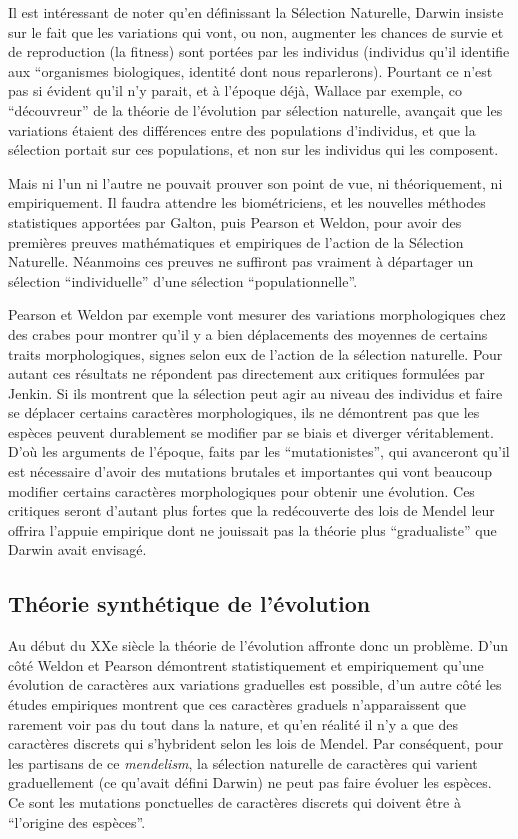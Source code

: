 \documentclass[a4paper,10pt]{article}
\begin{document}
Il est intéressant de noter qu'en définissant la Sélection Naturelle, Darwin insiste sur le fait que les variations qui vont, ou non, augmenter les chances de survie et de reproduction (la fitness) sont portées par les individus (individus qu'il identifie aux ``organismes biologiques, identité dont nous reparlerons). Pourtant ce n'est pas si évident qu'il n'y parait, et à l'époque déjà, Wallace par exemple, co ``découvreur'' de la théorie de l'évolution par sélection naturelle, avançait que les variations étaient des différences entre des populations d'individus, et que la sélection portait sur ces populations, et non sur les individus qui les composent. 

Mais ni l'un ni l'autre ne pouvait prouver son point de vue, ni théoriquement, ni empiriquement. Il faudra attendre les biométriciens, et les nouvelles méthodes statistiques apportées par Galton, puis Pearson et Weldon, pour avoir des premières preuves mathématiques et empiriques de l'action de la Sélection Naturelle. Néanmoins ces preuves ne suffiront pas vraiment à départager un sélection ``individuelle'' d'une sélection ``populationnelle''.

Pearson et Weldon par exemple vont mesurer des variations morphologiques chez des crabes pour montrer qu'il y a bien déplacements des moyennes de certains traits morphologiques, signes selon eux de l'action de la sélection naturelle. Pour autant ces résultats ne répondent pas directement aux critiques formulées par Jenkin. Si ils montrent que la sélection peut agir au niveau des individus et faire se déplacer certains caractères morphologiques, ils ne démontrent pas que les espèces peuvent durablement se modifier par se biais et diverger véritablement. D'où les arguments de l'époque, faits par les ``mutationistes'', qui avanceront qu'il est nécessaire d'avoir des mutations brutales et importantes qui vont beaucoup modifier certains caractères morphologiques pour obtenir une évolution. Ces critiques seront d'autant plus fortes que la redécouverte des lois de Mendel leur offrira l'appuie empirique dont ne jouissait pas la théorie plus ``gradualiste'' que Darwin avait envisagé.

\subsection{Théorie synthétique de l'évolution}\label{sec:SM}
Au début du XXe siècle la théorie de l'évolution affronte donc un problème. D'un côté Weldon et Pearson démontrent statistiquement et empiriquement qu'une évolution de caractères aux variations graduelles est possible, d'un autre côté les études empiriques montrent que ces caractères graduels n'apparaissent que rarement voir pas du tout dans la nature, et qu'en réalité il n'y a que des caractères discrets qui s'hybrident selon les lois de Mendel. Par conséquent, pour les partisans de ce \emph{mendelism}, la sélection naturelle de caractères qui varient graduellement (ce qu'avait défini Darwin) ne peut pas faire évoluer les espèces. Ce sont les mutations ponctuelles de caractères discrets qui doivent être à ``l'origine des espèces''. 
\end{document}
